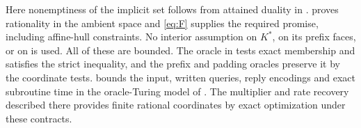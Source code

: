 Here nonemptiness of the implicit set follows from attained duality in .  proves rationality in the ambient space and \eqref{eq:F} supplies the required promise, including affine-hull constraints. No interior assumption on $K^*$, on its prefix faces, or on \FaceLP{} is used. All of these are bounded. The oracle in  tests exact membership and satisfies the strict inequality, and the prefix and padding oracles preserve it by the coordinate tests.  bounds the input, written queries, reply encodings and exact subroutine time in the oracle-Turing model of \cite[\S1.2, pp.~26--27]{gls1988}. The multiplier and rate recovery described there provides finite rational coordinates by exact optimization under these contracts.
